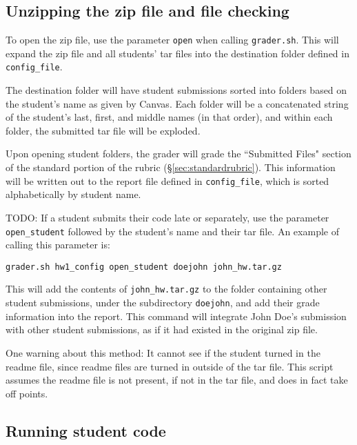 \documentclass[12pt]{article}
\begin{document}
\subsection{Unzipping the zip file and file checking} \label{sec:unzipping}

To open the zip file, use the parameter \texttt{open} when calling \texttt{grader.sh}. This will expand the zip file and all students' tar files into the destination folder defined in \texttt{config\_file}.

The destination folder will have student submissions sorted into folders based on the student's name as given by Canvas. Each folder will be a concatenated string of the student's last, first, and middle names (in that order), and within each folder, the submitted tar file will be exploded.

Upon opening student folders, the grader will grade the ``Submitted Files" section of the standard portion of the rubric (\S\ref{sec:standardrubric}). This information will be written out to the report file defined in \texttt{config\_file}, which is sorted alphabetically by student name.

TODO: If a student submits their code late or separately, use the parameter \texttt{open\_student} followed by the student's name and their tar file. An example of calling this parameter is:

\vspace{5pt}

\texttt{grader.sh hw1\_config open\_student doejohn john\_hw.tar.gz}

\vspace{5pt}

This will add the contents of \texttt{john\_hw.tar.gz} to the folder containing other student submissions, under the subdirectory \texttt{doejohn}, and add their grade information into the report. This command will integrate John Doe's submission with other student submissions, as if it had existed in the original zip file.

One warning about this method: It cannot see if the student turned in the readme file, since readme files are turned in outside of the tar file. This script assumes the readme file is not present, if not in the tar file, and does in fact take off points.

\vspace{5pt}

\subsection{Running student code} \label{sec:runningcode}
\end{document}
